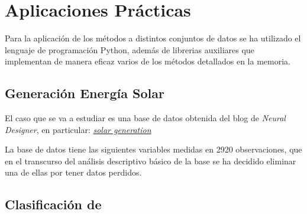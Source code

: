 \chapter{Aplicaciones Prácticas}

\noindent Para la aplicación de los métodos a distintos conjuntos de datos se ha utilizado el lenguaje de programación Python, además de librerias auxiliares que implementan de manera eficaz varios de los métodos detallados en la memoria. 

\section{Generación Energía Solar}

\noindent El caso que se va a estudiar es una base de datos obtenida del blog de \textit{Neural Designer}, en particular: \href{https://www.neuraldesigner.com/learning/examples/solar-power-generation}{\textit{solar generation}}



\noindent La base de datos tiene las siguientes variables medidas en 2920 observaciones, que en el transcurso del análisis descriptivo básico de la base se ha decidido eliminar una de ellas por tener datos perdidos. 

\section{Clasificación de }